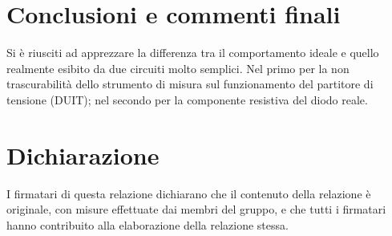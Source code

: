 \documentclass[10pt,a4paper]{article}
\begin{document}
\section{Conclusioni e commenti finali}
Si è riusciti ad apprezzare la differenza tra il comportamento ideale e quello
realmente esibito da due circuiti molto semplici. Nel primo per la non
trascurabilità dello strumento di misura sul funzionamento del partitore di
tensione (DUIT); nel secondo per la componente resistiva del diodo reale.

\section*{Dichiarazione}
I firmatari di questa relazione dichiarano che il contenuto della relazione
\`e originale, con misure effettuate dai membri del gruppo, e che tutti i
firmatari hanno contribuito alla elaborazione della relazione stessa.
\end{document}
